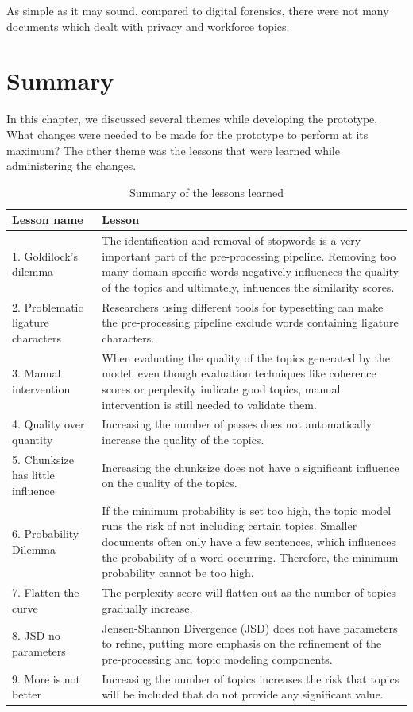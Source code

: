 As simple as it may sound, compared to digital forensics, there were not many documents which dealt with privacy and workforce topics.

\section{Summary}

In this chapter, we discussed several themes while developing the prototype. What changes were needed to be made for the prototype to perform at its maximum? The other theme was the lessons that were learned while administering the changes.

\begin{table}[]
\begin{tabularx}{\textwidth}{|l|X|}
\hline
\textbf{Lesson name} & \textbf{Lesson} \\ \hline
1. Goldilock's dilemma & The identification and removal of stopwords is a very important part of the pre-processing pipeline. Removing too many domain-specific words negatively influences the quality of the topics and ultimately, influences the similarity scores. \\ \hline
2. Problematic ligature characters & Researchers using different tools for typesetting can make the pre-processing pipeline exclude words containing ligature characters. \\ \hline
3. Manual intervention & When evaluating the quality of the topics generated by the model, even though evaluation techniques like coherence scores or perplexity indicate good topics, manual intervention is still needed to validate them. \\ \hline
4. Quality over quantity & Increasing the number of passes does not automatically increase the quality of the topics. \\ \hline
5. Chunksize has little influence & Increasing the chunksize does not have a significant influence on the quality of the topics. \\ \hline
6. Probability Dilemma & If the minimum probability is set too high, the topic model runs the risk of not including certain topics. Smaller documents often only have a few sentences, which influences the probability of a word occurring. Therefore, the minimum probability cannot be too high. \\ \hline
7. Flatten the curve & The perplexity score will flatten out as the number of topics gradually increase. \\ \hline
8. JSD no parameters & Jensen-Shannon Divergence (JSD) does not have parameters to refine, putting more emphasis on the refinement of the pre-processing and topic modeling components. \\ \hline
9. More is not better & Increasing the number of topics increases the risk that topics will be included that do not provide any significant value. \\ \hline
\end{tabularx}
\caption{Summary of the lessons learned}
\label{tab:lessons}
\end{table}
 
